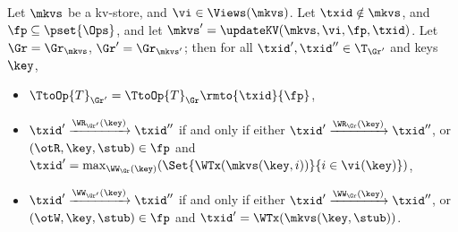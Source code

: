 \begin{lemma}
\label{lem:graph.update}
Let $\mkvs$ be a kv-store, and $\vi \in \Views(\mkvs)$. Let $\txid \notin \mkvs$, and 
$\fp \subseteq \pset{\Ops}$, and let $\mkvs' = \updateKV(\mkvs, \vi, \fp, \txid)$. 
Let $\Gr = \Gr_{\mkvs}$, $\Gr' = \Gr_{\mkvs'}$; then for all $\txid', \txid'' \in \T_{\Gr'}$ and keys $\key$, 
\begin{itemize}
\item $\TtoOp{T}_{\Gr'} = \TtoOp{T}_{\Gr}\rmto{\txid}{\fp}$, 
\item $\txid' \xrightarrow{\WR_{\Gr'}(\key)} \txid''$ if and only if either 
$\txid' \xrightarrow{\WR_{\Gr}(\key)} \txid''$, or $(\otR, \key, \stub) \in \fp$ and 
$\txid' = \max_{\WW_{\Gr}(\key)}(\Set{\WTx(\mkvs(\key, i)) }{ i \in \vi(\key)})$, 
\item $\txid' \xrightarrow{\WW_{\Gr'}(\key)} \txid''$ if and only if either 
$\txid' \xrightarrow{\WW_{\Gr}(\key)} \txid''$, or $(\otW, \key, \stub) \in \fp$ 
and $\txid' = \WTx(\mkvs(\key, \stub))$. 
\end{itemize}
\end{lemma}

